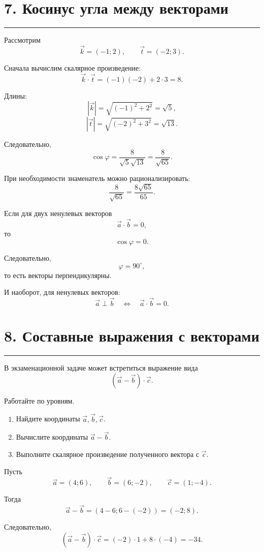 \documentclass[a4paper,12pt]{article}
\newcommand{\sectionline}{%
    \par\noindent
    {\color{accent}\rule{\linewidth}{0.6pt}}
    \par
}
\begin{document}
\section*{\color{darkaccent}7. Косинус угла между векторами}

\sectionline

Рассмотрим
\[
\vec k=(-1;2),
\qquad
\vec t=(-2;3).
\]

Сначала вычислим скалярное произведение:
\[
\vec k\cdot\vec t
=
(-1)(-2)+2\cdot3
=
8.
\]

Длины:
\[
|\vec k|
=
\sqrt{(-1)^2+2^2}
=
\sqrt5,
\]
\[
|\vec t|
=
\sqrt{(-2)^2+3^2}
=
\sqrt{13}.
\]

Следовательно,
\[
\cos\varphi
=
\frac8{\sqrt5\sqrt{13}}
=
\frac8{\sqrt{65}}.
\]

При необходимости знаменатель можно рационализировать:
\[
\frac8{\sqrt{65}}
=
\frac{8\sqrt{65}}{65}.
\]

\begin{keybox}
Если для двух ненулевых векторов
\[
\vec a\cdot\vec b=0,
\]
то
\[
\cos\varphi=0.
\]

Следовательно,
\[
\varphi=90^\circ,
\]
то есть векторы перпендикулярны.
\end{keybox}

И наоборот, для ненулевых векторов:
\[
\boxed{
\vec a\perp\vec b
\quad\Longleftrightarrow\quad
\vec a\cdot\vec b=0.
}
\]


\section*{\color{darkaccent}8. Составные выражения с векторами}

\sectionline

В экзаменационной задаче может встретиться выражение вида
\[
(\vec a-\vec b)\cdot\vec c.
\]

Работайте по уровням.

\begin{enumerate}[label=\arabic*.,leftmargin=8mm,itemsep=2pt]
    \item Найдите координаты \(\vec a,\vec b,\vec c\).
    \item Вычислите координаты \(\vec a-\vec b\).
    \item Выполните скалярное произведение полученного вектора с \(\vec c\).
\end{enumerate}

\begin{examplebox}[Пример]
Пусть
\[
\vec a=(4;6),
\qquad
\vec b=(6;-2),
\qquad
\vec c=(1;-4).
\]

Тогда
\[
\vec a-\vec b
=
(4-6;6-(-2))
=
(-2;8).
\]

Следовательно,
\[
(\vec a-\vec b)\cdot\vec c
=
(-2)\cdot1+8\cdot(-4)
=
-34.
\]
\end{examplebox}
\end{document}
